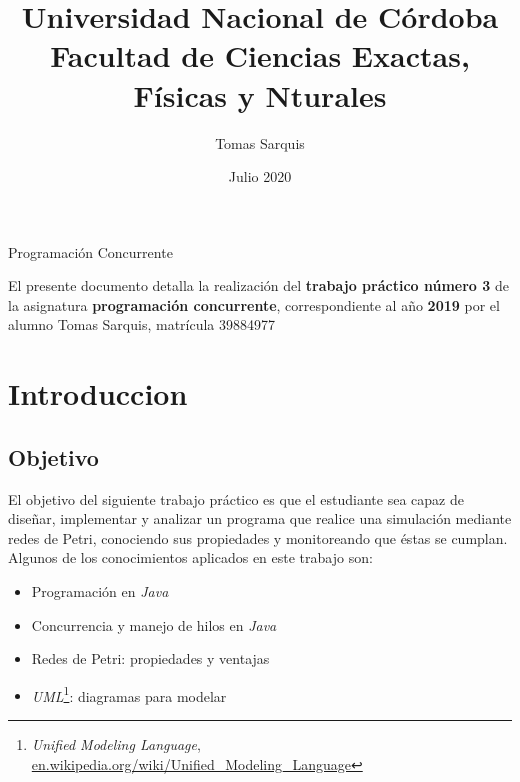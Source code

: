 \documentclass{article}
\title{Universidad Nacional de Córdoba\\Facultad de Ciencias Exactas, Físicas y Nturales}
\author{Tomas Sarquis}
\date{Julio 2020}
\newcommand{\fnuml}{\emph{Unified Modeling Language}, \url{en.wikipedia.org/wiki/Unified_Modeling_Language}}
\begin{document}
    \begin{titlingpage}
        \maketitle
        \null \null \null \null
        \begin{center}
            {\huge Programación Concurrente}
        \end{center}
        \vspace*{\fill}
        El presente documento detalla la realización del \textbf{trabajo práctico número 3} 
        de la asignatura \textbf{programación concurrente}, correspondiente al año \textbf{2019}
        por el alumno Tomas Sarquis, matrícula 39884977
        \vspace*{\fill}
    \end{titlingpage}
    \tableofcontents \newpage
    \section{Introduccion}
    \subsection{Objetivo}
    \begin{flushleft}
        El objetivo del siguiente trabajo práctico es que el estudiante sea capaz de diseñar,
        implementar y analizar un programa que realice una simulación mediante redes de Petri,
        conociendo sus propiedades y monitoreando que éstas se cumplan. \\
        Algunos de los conocimientos aplicados en este trabajo son: \\
        \begin{itemize}
            \item Programación en \emph{Java}
            \item Concurrencia y manejo de hilos en \emph{Java}
            \item Redes de Petri: propiedades y ventajas
            \item \emph{UML}\footnote{\fnuml}: diagramas para modelar
        \end{itemize}
    \end{flushleft}
\end{document}
